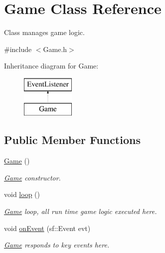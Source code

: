 \hypertarget{class_game}{}\section{Game Class Reference}
\label{class_game}


Class manages game logic.  




{\ttfamily \#include $<$Game.\+h$>$}

Inheritance diagram for Game\+:\begin{figure}[H]
\begin{center}
\leavevmode
\includegraphics[height=2.000000cm]{class_game}
\end{center}
\end{figure}
\subsection*{Public Member Functions}
\begin{DoxyCompactItemize}
\item 
\mbox{\label{class_game_ad59df6562a58a614fda24622d3715b65}} 
\hyperlink{class_game_ad59df6562a58a614fda24622d3715b65}{Game} ()
\begin{DoxyCompactList}\small\item\em \hyperlink{class_game}{Game} constructor. \end{DoxyCompactList}\item 
\mbox{\label{class_game_a7ad92b77b596d7882a7ae76eb18b5e6c}} 
void \hyperlink{class_game_a7ad92b77b596d7882a7ae76eb18b5e6c}{loop} ()
\begin{DoxyCompactList}\small\item\em \hyperlink{class_game}{Game} loop, all run time game logic executed here. \end{DoxyCompactList}\item 
\mbox{\label{class_game_a9f1e6b43d3f4136d7293c3bfc852770b}} 
void \hyperlink{class_game_a9f1e6b43d3f4136d7293c3bfc852770b}{on\+Event} (sf\+::\+Event evt)
\begin{DoxyCompactList}\small\item\em \hyperlink{class_game}{Game} responds to key events here. \end{DoxyCompactList}\end{DoxyCompactItemize}


